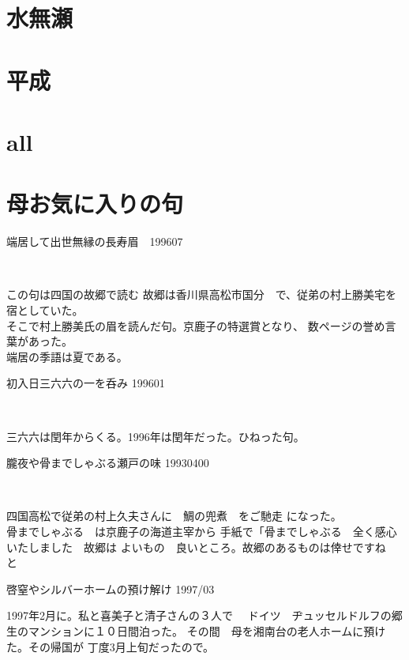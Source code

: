 \documentclass[b5paper]{tbook}
\begin{document}

\chapter{水無瀬}

\chapter{平成}

\vspace{0.6cm}
\chapter{all}

\chapter{母お気に入りの句}%
\begin{shiika}端居して出世無縁の長寿眉　\hfill{199607}　\end{shiika}　　　

この句は四国の故郷で読む
故郷は香川県高松市国分　で、従弟の村上勝美宅を宿としていた。
\\そこで村上勝美氏の眉を読んだ句。京鹿子の特選賞となり、
数ページの誉め言葉があった。\\端居の季語は夏である。

\vspace{5mm}
\begin{shiika}初入日三六六の一を呑み 199601　\end{shiika}　

三六六は閏年からくる。1996年は閏年だった。ひねった句。
\vspace{5mm}
\begin{shiika}朧夜や骨までしゃぶる瀬戸の味 19930400\end{shiika}　

四国高松で従弟の村上久夫さんに　鯛の兜煮　をご馳走
になった。
\\骨までしゃぶる　は京鹿子の海道主宰から
手紙で「骨までしゃぶる　全く感心いたしました　故郷は
よいもの　良いところ。故郷のあるものは倖せですね　と
\vspace{5mm}
\begin{shiika}啓窒やシルバーホームの預け解け 1997/03\end{shiika}

1997年2月に。私と喜美子と清子さんの３人で　
ドイツ　ヂュッセルドルフの郷生のマンションに１０日間泊った。
その間　母を湘南台の老人ホームに預けた。その帰国が
丁度3月上旬だったので。
\vspace{5mm}
\end{document}
